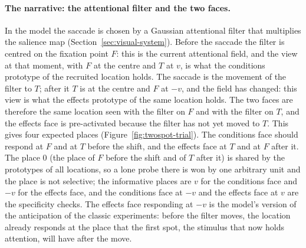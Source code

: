\documentclass[14pt]{article}
\begin{document}
\paragraph{The narrative: the attentional filter and the two faces.}
In the model the saccade is chosen by a Gaussian attentional filter that multiplies the salience map (Section~\ref{sec:visual-system}).
Before the saccade the filter is centred on the fixation point $F$: this is the current attentional field, and the view at that moment, with $F$ at the centre and $T$ at $v$, is what the conditions prototype of the recruited location holds.
The saccade is the movement of the filter to $T$; after it $T$ is at the centre and $F$ at $-v$, and the field has changed: this view is what the effects prototype of the same location holds.
The two faces are therefore the same location seen with the filter on $F$ and with the filter on $T$, and the effects face is pre-activated because the filter has not yet moved to $T$.
This gives four expected places (Figure~\ref{fig:twospot-trial}).
The conditions face should respond at $F$ and at $T$ before the shift, and the effects face at $T$ and at $F$ after it.
The place $0$ (the place of $F$ before the shift and of $T$ after it) is shared by the prototypes of all locations, so a lone probe there is won by one arbitrary unit and the place is not selective; the informative places are $v$ for the conditions face and $-v$ for the effects face, and the conditions face at $-v$ and the effects face at $v$ are the specificity checks.
The effects face responding at $-v$ is the model's version of the anticipation of the classic experiments: before the filter moves, the location already responds at the place that the first spot, the stimulus that now holds attention, will have after the move.
\end{document}
